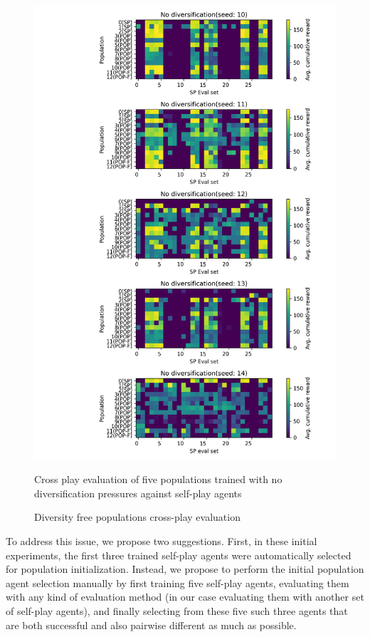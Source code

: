 \begin{figure}[!ht]
    \centering
    \includegraphics*[width=14.5cm]{../img/Forced_coordination_CNN_POP_NO_DIF(2).png}

    \caption{Diversity free populations cross-play evaluation}
    \label{CNNPopNoDiffBestInitFixation}
    \medskip
    \small 
    Cross play evaluation of five populations trained with no diversification pressures against self-play agents

\end{figure}

To address this issue, we propose two suggestions.
First, in these initial experiments, the first three trained self-play agents were automatically selected for population initialization.
Instead, we propose to perform the initial population agent selection manually by first training five self-play agents, evaluating them with any kind of evaluation method (in our case evaluating them with another set of self-play agents), and finally selecting from these five such three agents that are both successful and also pairwise different as much as possible.


